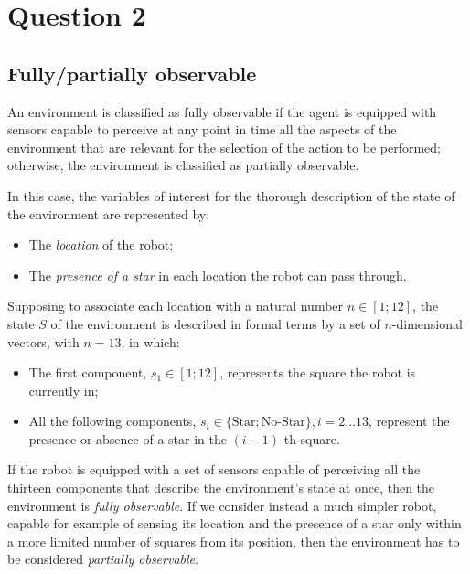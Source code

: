 \documentclass[letterpaper,headings=standardclasses]{scrartcl}
\begin{document}
\section{Question 2}

\subsection{Fully/partially observable}

An environment is classified as fully observable if the agent is equipped with sensors capable to perceive at any point in time all the aspects of the environment that are relevant for the selection of the action to be performed; otherwise, the environment is classified as partially observable.

In this case, the variables of interest for the thorough description of the state of the environment are represented by:

\begin{itemize}

\item The \emph{location} of the robot;
\item The \emph{presence of a star} in each location the robot can pass through.

\end{itemize}

Supposing to associate each location with a natural number $n \in [1; 12]$, the state $S$ of the environment is described in formal terms by a set of $n$-dimensional vectors, with $n = 13$, in which:

\begin{itemize}

\item The first component, $s_1 \in [1;12]$, represents the square the robot is currently in;
\item All the following components, $s_i \in \{\text{Star}; \text{No-Star}\}, i = 2 ... 13$, represent the presence or absence of a star in the $(i-1)$-th square.

\end{itemize}

If the robot is equipped with a set of sensors capable of perceiving all the thirteen components that describe the environment's state at once, then the environment is \emph{fully observable}. If we consider instead a much simpler robot, capable for example of sensing its location and the presence of a star only within a more limited number of squares from its position, then the environment has to be considered \emph{partially observable}.
\end{document}
